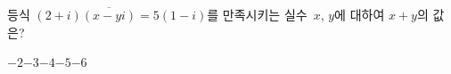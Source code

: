 등식 $(2+i)\overline{(x-yi)}=5(1-i)$를 만족시키는 실수~$x$, $y$에 대하여 $x+y$의 값은?
\begin{choices32}{$-2$}{$-3$}{$-4$}{$-5$}{$-6$}\end{choices32}

